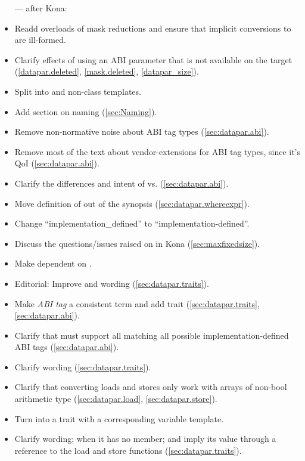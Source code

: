 \begin{itemize}
  \color{black}\item[---] after Kona:
  \item Readd \bool overloads of mask reductions and ensure that implicit conversions to \bool are ill-formed.
  \item Clarify effects of using an ABI parameter that is not available on the target (\ref{datapar.deleted}, \ref{mask.deleted}, \ref{datapar_size}).
  \item Split \whereexpression into \const and non-\const class templates.
  \item Add section on naming (\ref{sec:Naming}).
  \item Remove non-normative noise about ABI tag types (\ref{sec:datapar.abi}).
  \item Remove most of the text about vendor-extensions for ABI tag types, since it's QoI (\ref{sec:datapar.abi}).
  \item Clarify the differences and intent of  vs.  (\ref{sec:datapar.abi}).
  \item Move definition of \whereexpression out of the synopsis (\ref{sec:datapar.whereexpr}).
  \item Change “implementation_defined” to “implementation-defined”.
  \item Discuss the questions/issues raised on  in Kona (\ref{sec:maxfixedsize}).
  \item Make  dependent on .
  \item Editorial: Improve  and  wording (\ref{sec:datapar.traits}).
  \item Make \emph{ABI tag} a consistent term and add  trait (\ref{sec:datapar.traits}, \ref{sec:datapar.abi}).
  \item Clarify that \fixedsizeN must support all  matching all possible implementation-defined ABI tags (\ref{sec:datapar.abi}).
  \item Clarify  wording (\ref{sec:datapar.traits}).
  \item Clarify that converting loads and stores only work with arrays of non-bool arithmetic type (\ref{sec:datapar.load}, \ref{sec:datapar.store}).
  \item Turn  into a trait with a corresponding  variable template.
  \item Clarify  wording; when it has no  member; and imply its value through a reference to the load and store functions (\ref{sec:datapar.traits}).

\end{itemize}
